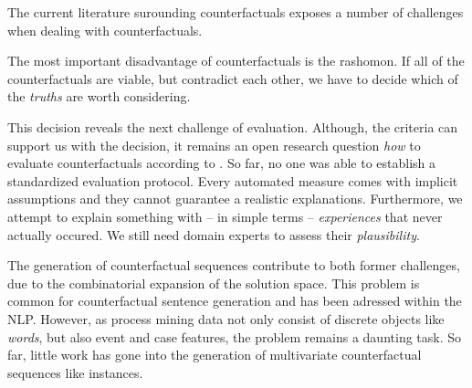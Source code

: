\documentclass[./../../paper.tex]{subfiles}
\begin{document}
The current literature surounding counterfactuals exposes a number of challenges when dealing with counterfactuals.

The most important disadvantage of counterfactuals is the \gls{rashomon}\autocite[ch.9.3]{molnar2019}. If all of the counterfactuals are viable, but contradict each other, we have to decide which of the \emph{truths} are worth considering.

This decision reveals the next challenge of evaluation. Although, the criteria can support us with the decision, it remains an open research question \emph{how} to evaluate counterfactuals according to \citeauthor{carvalho_MachineLearningInterpretability_2019}. So far, no one was able to establish a standardized evaluation protocol\autocite{hsieh_DiCE4ELInterpretingProcess_2021}. Every automated measure comes with implicit assumptions and they cannot guarantee a realistic explanations. Furthermore, we attempt to explain something with -- in simple terms -- \emph{experiences} that never actually occured. We still need domain experts to assess their \emph{plausibility}.

The generation of counterfactual sequences contribute to both former challenges, due to the combinatorial expansion of the solution space. This problem is common for counterfactual sentence generation and has been adressed within the \gls{NLP}. However, as process mining data not only consist of discrete objects like \emph{words}, but also event and case features, the problem remains a daunting task. So far, little work has gone into the generation of multivariate counterfactual sequences like \glspl{instance}.


\end{document}
